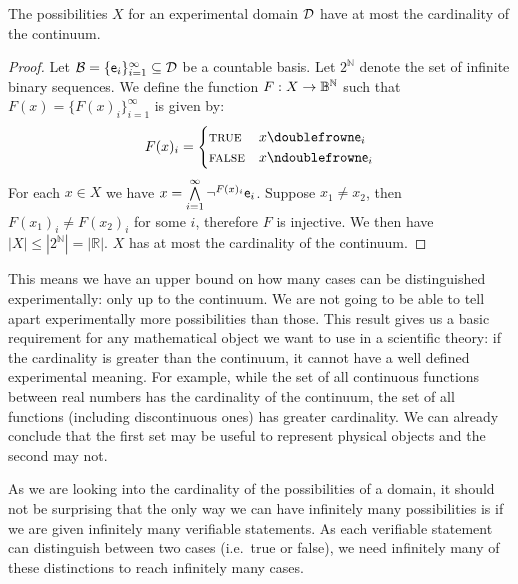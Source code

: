\documentclass[11pt,letterpaper,fleqn]{memoir} %
\begin{document}
\begin{mathSection}
	\begin{thrm}
		The possibilities $X$ for an experimental domain $\edomain$ have at most the cardinality of the continuum.
	\end{thrm}
	
	\begin{proof}
		Let $\basis = \{\stmt[e]_i\}_{i=1}^{\infty} \subseteq \edomain$ be a countable basis. Let $2^{\mathbb{N}}$ denote the set of infinite binary sequences. We define the function $F:X\to\Bool^{\mathbb{N}}$ such that $F(x) = \{F(x)_i\}_{i=1}^{\infty}$ is given by: 
		$$
		F(x)_i = 
		\begin{cases}
		\TRUE & x \comp \stmt[e]_i \\
		\FALSE & x \ncomp \stmt[e]_i
		\end{cases}
		$$
		For each $x \in X$ we have $x = \bigAND\limits_{i=1}^{\infty} \NOT^{F(x)_i} \stmt[e]_i$. Suppose $x_1 \neq x_2$, then $F(x_1)_i \neq F(x_2)_i$ for some $i$, therefore $F$ is injective. We then have $|X| \leq |2^{\mathbb{N}}|=|\mathbb{R}|$. $X$ has at most the cardinality of the continuum.
	\end{proof}
\end{mathSection}

This means we have an upper bound on how many cases can be distinguished experimentally: only up to the continuum. We are not going to be able to tell apart experimentally more possibilities than those. This result gives us a basic requirement for any mathematical object we want to use in a scientific theory: if the cardinality is greater than the continuum, it cannot have a well defined experimental meaning. For example, while the set of all continuous functions between real numbers has the cardinality of the continuum, the set of all functions (including discontinuous ones) has greater cardinality. We can already conclude that the first set may be useful to represent physical objects and the second may not.

As we are looking into the cardinality of the possibilities of a domain, it should not be surprising that the only way we can have infinitely many possibilities is if we are given infinitely many verifiable statements. As each verifiable statement can distinguish between two cases (i.e.~true or false), we need infinitely many of these distinctions to reach infinitely many cases.
\end{document}
